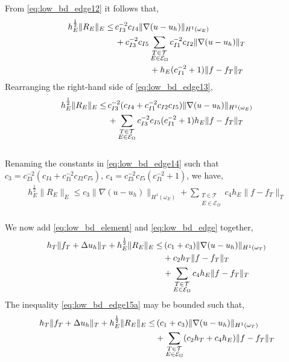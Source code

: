 From \eqref{eq:low_bd_edge12} it follows that,
\begin{align} \label{eq:low_bd_edge13}
h_E^{\frac{1}{2}} \|R_E\|_E \leq & \, c_{I3}^{-2}c_{I4} \| \nabla (u-u_h) \|_{H^1(\omega_E)} \\
& \, + c_{I3}^{-2}c_{I5}\displaystyle\sum_{\substack{T \in \mathcal{T} \\ E \in \mathcal{E}_\Omega}} c_{I1}^{-2}c_{I2}\|\nabla(u-u_h) \|_T \notag \\
& \hspace{1.5cm} + h_E (c_{I1}^{-2} +1) \|f-f_T\|_T \notag
\end{align}
Rearranging the right-hand side of \eqref{eq:low_bd_edge13},
\begin{align} \label{eq:low_bd_edge14}
h_E^{\frac{1}{2}} \|R_E\|_E \leq & \, c_{I3}^{-2}(c_{I4} + c_{I1}^{-2}c_{I2}c_{I5}) \| \nabla (u-u_h) \|_{H^1(\omega_E)} \\
& \, +\displaystyle\sum_{\substack{T \in \mathcal{T} \\ E \in \mathcal{E}_\Omega}}  c_{I3}^{-2}c_{I5}(c_{I1}^{-2} +1) h_E\|f-f_T\|_T \notag
\end{align}
\\
Renaming the constants in \eqref{eq:low_bd_edge14} such that $c_3 = c_{I3}^{-2}(c_{I4} + c_{I1}^{-2}c_{I2}c_{I5})$, $c_4 = c_{I3}^{-2}c_{I5}(c_{I1}^{-2} +1)$, we have,
\begin{align} \label{eq:low_bd_edge}
h_E^{\frac{1}{2}} \|R_E\|_E \leq c_3 \| \nabla (u-u_h) \|_{H^1(\omega_E)} +\displaystyle\sum_{\substack{T \in \mathcal{T} \\ E \in \mathcal{E}_\Omega}}  c_4 h_E\|f-f_T\|_T
\end{align}
\\
We now add \eqref{eq:low_bd_element} and \eqref{eq:low_bd_edge} together,
\begin{align} \label{eq:low_bd_edge15a}
h_T \| f_T + \Delta u_h\|_T + h_E^{\frac{1}{2}} \|R_E\|_E \leq & \, (c_1 + c_3)\|\nabla(u-u_h) \|_{H^1(\omega_T)} \\
& + c_2 h_T \|f-f_T\|_T \notag \\
& +\displaystyle\sum_{\substack{T \in \mathcal{T} \\ E \in \mathcal{E}_\Omega}}  c_4 h_E\|f-f_T\|_T \notag
\end{align}
The inequality \eqref{eq:low_bd_edge15a} may be bounded such that, 
\begin{align*}
h_T \| f_T + \Delta u_h\|_T + h_E^{\frac{1}{2}} \|R_E\|_E \leq & \,(c_1 + c_3)\|\nabla(u-u_h) \|_{H^1(\omega_T)} \\
& +\displaystyle\sum_{\substack{T \in \mathcal{T} \\ E \in \mathcal{E}_\Omega}} (c_2 h_T + c_4 h_E)\|f-f_T\|_T \notag
\end{align*}
